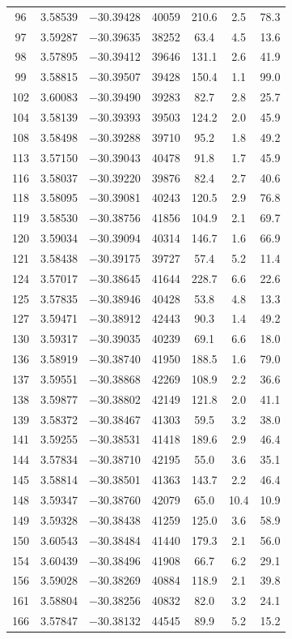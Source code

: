 \documentclass{aa}
\begin{document}
\begin{appendix}
\begin{longtable}{c c c c c c c}
96 & 3.58539 & $-$30.39428 & 40059 & 210.6 & 2.5 & 78.3 \\
97 & 3.59287 & $-$30.39635 & 38252 & 63.4 & 4.5 & 13.6 \\
98 & 3.57895 & $-$30.39412 & 39646 & 131.1 & 2.6 & 41.9 \\
99 & 3.58815 & $-$30.39507 & 39428 & 150.4 & 1.1 & 99.0 \\
102 & 3.60083 & $-$30.39490 & 39283 & 82.7 & 2.8 & 25.7 \\
104 & 3.58139 & $-$30.39393 & 39503 & 124.2 & 2.0 & 45.9 \\
108 & 3.58498 & $-$30.39288 & 39710 & 95.2 & 1.8 & 49.2 \\
113 & 3.57150 & $-$30.39043 & 40478 & 91.8 & 1.7 & 45.9 \\
116 & 3.58037 & $-$30.39220 & 39876 & 82.4 & 2.7 & 40.6 \\
118 & 3.58095 & $-$30.39081 & 40243 & 120.5 & 2.9 & 76.8 \\
119 & 3.58530 & $-$30.38756 & 41856 & 104.9 & 2.1 & 69.7 \\
120 & 3.59034 & $-$30.39094 & 40314 & 146.7 & 1.6 & 66.9 \\
121 & 3.58438 & $-$30.39175 & 39727 & 57.4 & 5.2 & 11.4 \\
124 & 3.57017 & $-$30.38645 & 41644 & 228.7 & 6.6 & 22.6 \\
125 & 3.57835 & $-$30.38946 & 40428 & 53.8 & 4.8 & 13.3 \\
127 & 3.59471 & $-$30.38912 & 42443 & 90.3 & 1.4 & 49.2 \\
130 & 3.59317 & $-$30.39035 & 40239 & 69.1 & 6.6 & 18.0 \\
136 & 3.58919 & $-$30.38740 & 41950 & 188.5 & 1.6 & 79.0 \\
137 & 3.59551 & $-$30.38868 & 42269 & 108.9 & 2.2 & 36.6 \\
138 & 3.59877 & $-$30.38802 & 42149 & 121.8 & 2.0 & 41.1 \\
139 & 3.58372 & $-$30.38467 & 41303 & 59.5 & 3.2 & 38.0 \\
141 & 3.59255 & $-$30.38531 & 41418 & 189.6 & 2.9 & 46.4 \\
144 & 3.57834 & $-$30.38710 & 42195 & 55.0 & 3.6 & 35.1 \\
145 & 3.58814 & $-$30.38501 & 41363 & 143.7 & 2.2 & 46.4 \\
148 & 3.59347 & $-$30.38760 & 42079 & 65.0 & 10.4 & 10.9 \\
149 & 3.59328 & $-$30.38438 & 41259 & 125.0 & 3.6 & 58.9 \\
150 & 3.60543 & $-$30.38484 & 41440 & 179.3 & 2.1 & 56.0 \\
154 & 3.60439 & $-$30.38496 & 41908 & 66.7 & 6.2 & 29.1 \\
156 & 3.59028 & $-$30.38269 & 40884 & 118.9 & 2.1 & 39.8 \\
161 & 3.58804 & $-$30.38256 & 40832 & 82.0 & 3.2 & 24.1 \\
166 & 3.57847 & $-$30.38132 & 44545 & 89.9 & 5.2 & 15.2 \\


\end{longtable}
\end{appendix}
\end{document}
